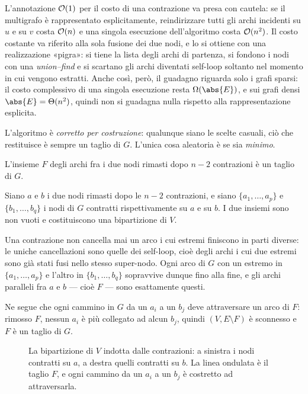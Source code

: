 \begin{osservazione}
L'annotazione $\mathcal{O}(1)$ per il costo di una contrazione va presa con cautela: se il
multigrafo è rappresentato esplicitamente, reindirizzare tutti gli archi incidenti su $u$ e
su $v$ costa $\mathcal{O}(n)$ e una singola esecuzione dell'algoritmo costa $\mathcal{O}(n^{2})$. Il costo
costante va riferito alla sola fusione dei due nodi, e lo si ottiene con una realizzazione
«pigra»: si tiene la lista degli archi di partenza, si fondono i nodi con una
\emph{union--find} e si scartano gli archi diventati self-loop soltanto nel momento in cui
vengono estratti. Anche così, però, il guadagno riguarda solo i grafi sparsi: il costo
complessivo di una singola esecuzione resta $\Om(\abs{E})$, e sui grafi densi
$\abs{E}=\Th(n^{2})$, quindi non si guadagna nulla rispetto alla rappresentazione
esplicita.
\end{osservazione}

L'algoritmo è \emph{corretto per costruzione}: qualunque siano le scelte casuali, ciò che
restituisce è sempre un taglio di $G$. L'unica cosa aleatoria è se sia \emph{minimo}.

\begin{lemma}\label{lem:taglio-residuo}
L'insieme $F$ degli archi fra i due nodi rimasti dopo $n-2$ contrazioni è un taglio di $G$.
\end{lemma}

\begin{dimostrazione*}
Siano $a$ e $b$ i due nodi rimasti dopo le $n-2$ contrazioni, e siano
$\{a_1,\dots,a_p\}$ e $\{b_1,\dots,b_q\}$ i nodi di $G$ contratti rispettivamente su $a$ e
su $b$. I due insiemi sono non vuoti e costituiscono una bipartizione di $V$.

Una contrazione non cancella mai un arco i cui estremi finiscono in parti diverse: le
uniche cancellazioni sono quelle dei self-loop, cioè degli archi i cui due estremi sono già
stati fusi nello stesso super-nodo. Ogni arco di $G$ con un estremo in $\{a_1,\dots,a_p\}$
e l'altro in $\{b_1,\dots,b_q\}$ sopravvive dunque fino alla fine, e gli archi paralleli
fra $a$ e $b$ — cioè $F$ — sono esattamente questi.

Ne segue che ogni cammino in $G$ da un $a_i$ a un $b_j$ deve attraversare un arco di $F$:
rimosso $F$, nessun $a_i$ è più collegato ad alcun $b_j$, quindi $(V,E\setminus F)$ è
sconnesso e $F$ è un taglio di $G$.
\end{dimostrazione*}

\begin{figure}[H]
  \centering
  
  \caption{La bipartizione di $V$ indotta dalle contrazioni: a sinistra i nodi contratti su
  $a$, a destra quelli contratti su $b$. La linea ondulata è il taglio $F$, e ogni cammino
  da un $a_i$ a un $b_j$ è costretto ad attraversarla.}
  \label{fig:karger-bipartizione-taglio}
\end{figure}

